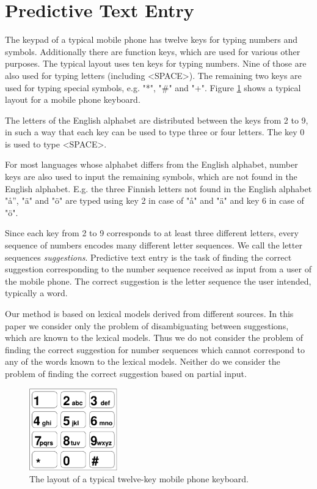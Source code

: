 \documentclass[a4paper,conference]{IEEEtran}
\begin{document}
\section{Predictive Text Entry}
\label{sec:text-entry}

The keypad of a typical mobile phone has twelve keys for typing
numbers and symbols. Additionally there are function keys, which are
used for various other purposes. The typical layout uses ten keys for
typing numbers. Nine of those are also used for typing letters (including
<SPACE>). The remaining two keys are used for typing special symbols,
e.g. "*", "\#" and "+". Figure \ref{fig:keypad} shows a typical layout
for a mobile phone keyboard.

The letters of the English alphabet are distributed between the keys
from 2 to 9, in such a way that each key can be used to type three or
four letters. The key 0 is used to type <SPACE>.

For most languages whose alphabet differs from the English alphabet,
number keys are also used to input the remaining symbols, which are
not found in the English alphabet. E.g. the three Finnish letters not
found in the English alphabet "å'', "\"{a}" and "\"{o}" are typed
using key 2 in case of "å" and "\"{a}" and key 6 in case of "\"{o}".

Since each key from 2 to 9 corresponds to at least three different
letters, every sequence of numbers encodes many different letter
sequences. We call the letter sequences {\it suggestions}. Predictive
text entry is the task of finding the correct suggestion corresponding
to the number sequence received as input from a user of the mobile
phone. The correct suggestion is the letter sequence the user
intended, typically a word.

Our method is based on lexical models derived from different
sources. In this paper we consider only the problem of disambiguating
between suggestions, which are known to the lexical models. Thus we do
not consider the problem of finding the correct suggestion for number
sequences which cannot correspond to any of the words known to the
lexical models. Neither do we consider the problem of finding the
correct suggestion based on partial input.

\begin{figure}
\begin{center}
\includegraphics[width=1.5in]{keypad.pdf}
\end{center}
\caption{The layout of a typical twelve-key mobile phone keyboard.}
\label{fig:keypad}
\end{figure}
\end{document}
